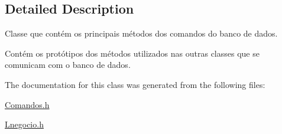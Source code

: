 \subsection{Detailed Description}
Classe que contém os principais métodos dos comandos do banco de dados. 

Contém os protótipos dos métodos utilizados nas outras classes que se comunicam com o banco de dados. 

The documentation for this class was generated from the following files\+:\begin{DoxyCompactItemize}
\item 
\hyperlink{_comandos_8h}{Comandos.\+h}\item 
\hyperlink{_lnegocio_8h}{Lnegocio.\+h}\end{DoxyCompactItemize}
